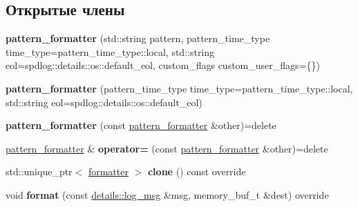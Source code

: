 \subsection*{Открытые члены}
\begin{DoxyCompactItemize}
\item 
\mbox{\label{classspdlog_1_1pattern__formatter_ae3bf5dc1c1e9556fcf97ad1ec1fa3dab}} 
{\bfseries pattern\+\_\+formatter} (std\+::string pattern, pattern\+\_\+time\+\_\+type time\+\_\+type=pattern\+\_\+time\+\_\+type\+::local, std\+::string eol=spdlog\+::details\+::os\+::default\+\_\+eol, custom\+\_\+flags custom\+\_\+user\+\_\+flags=\{\})
\item 
\mbox{\label{classspdlog_1_1pattern__formatter_a16b28756d44154881d51db40746b6e4e}} 
{\bfseries pattern\+\_\+formatter} (pattern\+\_\+time\+\_\+type time\+\_\+type=pattern\+\_\+time\+\_\+type\+::local, std\+::string eol=spdlog\+::details\+::os\+::default\+\_\+eol)
\item 
\mbox{\label{classspdlog_1_1pattern__formatter_a3c7051314c9422b667e254cb27d81b80}} 
{\bfseries pattern\+\_\+formatter} (const \hyperlink{classspdlog_1_1pattern__formatter}{pattern\+\_\+formatter} \&other)=delete
\item 
\mbox{\label{classspdlog_1_1pattern__formatter_a868ba15a181c7a407780aaa84902de31}} 
\hyperlink{classspdlog_1_1pattern__formatter}{pattern\+\_\+formatter} \& {\bfseries operator=} (const \hyperlink{classspdlog_1_1pattern__formatter}{pattern\+\_\+formatter} \&other)=delete
\item 
\mbox{\label{classspdlog_1_1pattern__formatter_aeb24b06fbf11bb3872c8fa82382350a8}} 
std\+::unique\+\_\+ptr$<$ \hyperlink{classspdlog_1_1formatter}{formatter} $>$ {\bfseries clone} () const override
\item 
\mbox{\label{classspdlog_1_1pattern__formatter_af7468a5fffcc75c4d449343d7788b5dd}} 
void {\bfseries format} (const \hyperlink{structspdlog_1_1details_1_1log__msg}{details\+::log\+\_\+msg} \&msg, memory\+\_\+buf\+\_\+t \&dest) override
\item 
\mbox{\label{classspdlog_1_1pattern__formatter_ae7b5e725b44ccdc6c7d87089b2628131}} 

\end{DoxyCompactItemize}
